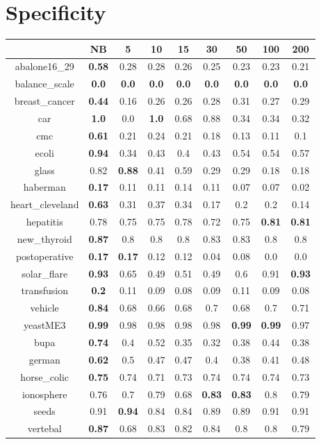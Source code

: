\documentclass{article}%
\begin{document}
%
\section*{Specificity}%
\begin{tabular}{c|cccccccc}%
\hline%
&NB&5&10&15&30&50&100&200\\%
\hline%
abalone16\_29&\textbf{0.58}&0.28&0.28&0.26&0.25&0.23&0.23&0.21\\%
\hline%
balance\_scale&\textbf{0.0}&\textbf{0.0}&\textbf{0.0}&\textbf{0.0}&\textbf{0.0}&\textbf{0.0}&\textbf{0.0}&\textbf{0.0}\\%
\hline%
breast\_cancer&\textbf{0.44}&0.16&0.26&0.26&0.28&0.31&0.27&0.29\\%
\hline%
car&\textbf{1.0}&0.0&\textbf{1.0}&0.68&0.88&0.34&0.34&0.32\\%
\hline%
cmc&\textbf{0.61}&0.21&0.24&0.21&0.18&0.13&0.11&0.1\\%
\hline%
ecoli&\textbf{0.94}&0.34&0.43&0.4&0.43&0.54&0.54&0.57\\%
\hline%
glass&0.82&\textbf{0.88}&0.41&0.59&0.29&0.29&0.18&0.18\\%
\hline%
haberman&\textbf{0.17}&0.11&0.11&0.14&0.11&0.07&0.07&0.02\\%
\hline%
heart\_cleveland&\textbf{0.63}&0.31&0.37&0.34&0.17&0.2&0.2&0.14\\%
\hline%
hepatitis&0.78&0.75&0.75&0.78&0.72&0.75&\textbf{0.81}&\textbf{0.81}\\%
\hline%
new\_thyroid&\textbf{0.87}&0.8&0.8&0.8&0.83&0.83&0.8&0.8\\%
\hline%
postoperative&\textbf{0.17}&\textbf{0.17}&0.12&0.12&0.04&0.08&0.0&0.0\\%
\hline%
solar\_flare&\textbf{0.93}&0.65&0.49&0.51&0.49&0.6&0.91&\textbf{0.93}\\%
\hline%
transfusion&\textbf{0.2}&0.11&0.09&0.08&0.09&0.11&0.09&0.08\\%
\hline%
vehicle&\textbf{0.84}&0.68&0.66&0.68&0.7&0.68&0.7&0.71\\%
\hline%
yeastME3&\textbf{0.99}&0.98&0.98&0.98&0.98&\textbf{0.99}&\textbf{0.99}&0.97\\%
\hline%
bupa&\textbf{0.74}&0.4&0.52&0.35&0.32&0.38&0.44&0.38\\%
\hline%
german&\textbf{0.62}&0.5&0.47&0.47&0.4&0.38&0.41&0.48\\%
\hline%
horse\_colic&\textbf{0.75}&0.74&0.71&0.73&0.74&0.74&0.74&0.73\\%
\hline%
ionosphere&0.76&0.7&0.79&0.68&\textbf{0.83}&\textbf{0.83}&0.8&0.79\\%
\hline%
seeds&0.91&\textbf{0.94}&0.84&0.84&0.89&0.89&0.91&0.91\\%
\hline%
vertebal&\textbf{0.87}&0.68&0.83&0.82&0.84&0.8&0.8&0.79\\%
\hline%
\end{tabular}
\end{document}
